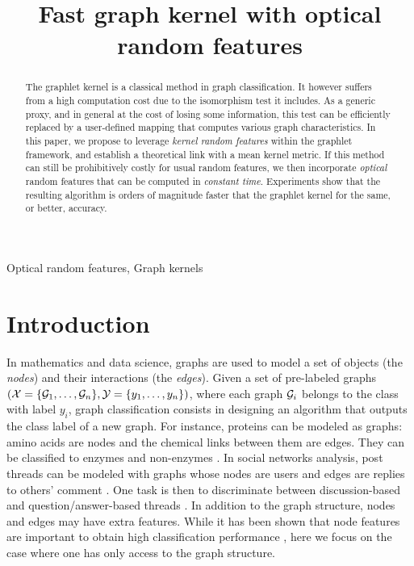 \documentclass{article}
\title{Fast graph kernel with optical random features}
\begin{document}
%
\newtheorem{theorem}{Theorem} 
\maketitle
%
\begin{abstract}
The graphlet kernel is a classical method in graph classification. It however suffers from a high computation cost due to the isomorphism test it includes. As a generic proxy, and in general at the cost of losing some information, this test can be efficiently replaced by a user-defined mapping that computes various graph characteristics. In this paper, we propose to leverage \emph{kernel random features} within the graphlet framework, and establish a theoretical link with a mean kernel metric. If this method can still be prohibitively costly for usual random features, we then incorporate \emph{optical} random features that can be computed in \emph{constant time}. Experiments show that the resulting algorithm is orders of magnitude faster that the graphlet kernel for the same, or better, accuracy.
\end{abstract}
%
\begin{keywords}
Optical random features, Graph kernels
\end{keywords}
%
\section{Introduction}
\label{sec:intro}
In mathematics and data science, graphs are used to model a set of objects (the \emph{nodes}) and their interactions (the \emph{edges}). %
Given a set of pre-labeled graphs $(\mathcal{X}=\{\mathcal{G}_1,\ldots,\mathcal{G}_n\}, \mathcal{Y}=\{y_1,\ldots,y_n\})$, where each graph $\mathcal{G}_i$ belongs to the class with label $y_i$, graph classification consists in designing an algorithm that outputs the class label of a new graph.
%
For instance, proteins can be modeled as graphs: amino acids are nodes and the chemical links between them are edges. They can be classified to enzymes and non-enzymes \cite{protein_application}.
%
In social networks analysis, post threads can be modeled with graphs whose nodes are users and edges are replies to others' comment \cite{graph_soc_net}. One task is then to discriminate between discussion-based and question/answer-based threads \cite{class_Reddit}.
%
In addition to the graph structure, nodes and edges may have extra features. While it has been shown that node features are important to obtain high classification performance \cite{node_features}, here we focus on the case where one has only access to the graph structure.%
\end{document}
